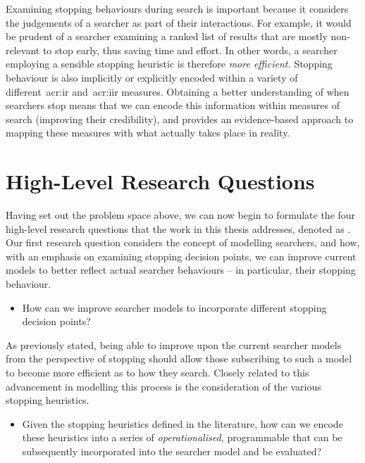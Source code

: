 Examining stopping behaviours during search is important because it considers the judgements of a searcher as part of their interactions. For example, it would be prudent of a searcher examining a ranked list of results that are mostly non-relevant to stop early, thus saving time and effort. In other words, a searcher employing a sensible stopping heuristic is therefore \emph{more efficient.} Stopping behaviour is also implicitly or explicitly encoded within a variety of different~\gls{acr:ir} and~\gls{acr:iir} measures. Obtaining a better understanding of when searchers stop means that we can encode this information within measures of search (improving their credibility), and provides an evidence-based approach to mapping these measures with what actually takes place in reality.

\section{High-Level Research Questions}\label{sec:intro:rqs}
Having set out the problem space above, we can now begin to formulate the four high-level research questions that the work in this thesis addresses, denoted as . Our first research question considers the concept of modelling searchers, and how, with an emphasis on examining stopping decision points, we can improve current models to better reflect actual searcher behaviours -- in particular, their stopping behaviour.

\begin{itemize}
    \item{ How can we improve searcher models to incorporate different stopping decision points?}
\end{itemize}

As previously stated, being able to improve upon the current searcher models from the perspective of stopping should allow those subscribing to such a model to become more efficient as to how they search. Closely related to this advancement in modelling this process is the consideration of the various stopping heuristics.

\begin{itemize}
    \item{ Given the stopping heuristics defined in the literature, how can we encode these heuristics into a series of \emph{operationalised,} programmable  that can be subsequently incorporated into the searcher model and be evaluated?}
\end{itemize}

